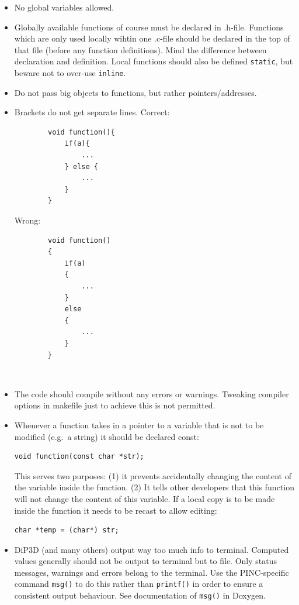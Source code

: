 \documentclass[10pt,a4paper]{article}
\begin{document}
\begin{itemize}
	\item No global variables allowed.
	\item Globally available functions of course must be declared in .h-file. Functions which are only used locally wihtin one .c-file should be declared in the top of that file (before any function definitions). Mind the difference between declaration and definition. Local functions should also be defined \lstinline$static$, but beware not to over-use \lstinline$inline$.
	\item Do not pass big objects to functions, but rather pointers/addresses.
	\item Brackets do not get separate lines. Correct:
	\begin{lstlisting}
		void function(){
			if(a){
				...
			} else {
				...
			}
		}
	\end{lstlisting}
	Wrong:
	\begin{lstlisting}
		void function()
		{
			if(a)
			{
				...
			}
			else
			{
				...
			}
		}
	\end{lstlisting}\
	\item The code should compile without any errors or warnings. Tweaking compiler options in makefile just to achieve this is not permitted.	
	\item Whenever a function takes in a pointer to a variable that is not to be modified (e.g.\ a string) it should be declared const:
	\begin{lstlisting}
void function(const char *str);
	\end{lstlisting}
	This serves two purposes: (1) it prevents accidentally changing the content of the variable inside the function. (2) It tells other developers that this function will not change the content of this variable. If a local copy is to be made inside the function it needs to be recast to allow editing:
	\begin{lstlisting}
char *temp = (char*) str;
	\end{lstlisting}
	\item DiP3D (and many others) output way too much info to terminal. Computed values generally should not be output to terminal but to file. Only status messages, warnings and errors belong to the terminal. Use the PINC-specific command \lstinline$msg()$ to do this rather than \lstinline$printf()$ in order to ensure a consistent output behaviour. See documentation of \lstinline$msg()$ in Doxygen.
\end{itemize}
\end{document}
